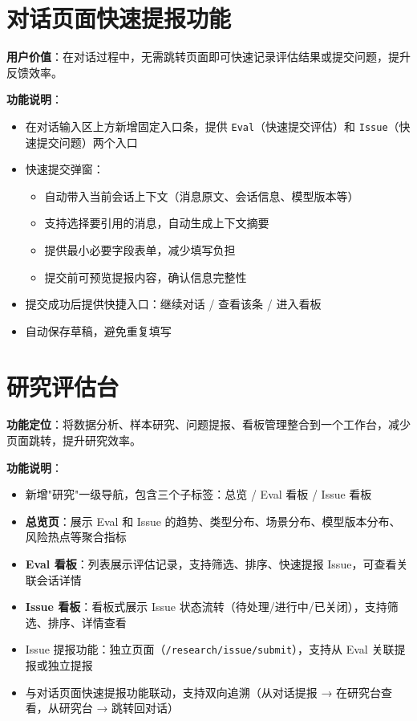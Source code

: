 \documentclass[UTF8]{ctexart}
\begin{document}
\section{对话页面快速提报功能}

\textbf{用户价值}：在对话过程中，无需跳转页面即可快速记录评估结果或提交问题，提升反馈效率。

\textbf{功能说明}：
\begin{itemize}
    \item 在对话输入区上方新增固定入口条，提供 \texttt{Eval}（快速提交评估）和 \texttt{Issue}（快速提交问题）两个入口
    \item 快速提交弹窗：
    \begin{itemize}
        \item 自动带入当前会话上下文（消息原文、会话信息、模型版本等）
        \item 支持选择要引用的消息，自动生成上下文摘要
        \item 提供最小必要字段表单，减少填写负担
        \item 提交前可预览提报内容，确认信息完整性
    \end{itemize}
    \item 提交成功后提供快捷入口：继续对话 / 查看该条 / 进入看板
    \item 自动保存草稿，避免重复填写
\end{itemize}

\section{研究评估台}

\textbf{功能定位}：将数据分析、样本研究、问题提报、看板管理整合到一个工作台，减少页面跳转，提升研究效率。

\textbf{功能说明}：
\begin{itemize}
    \item 新增"研究"一级导航，包含三个子标签：总览 / Eval 看板 / Issue 看板
    \item \textbf{总览页}：展示 Eval 和 Issue 的趋势、类型分布、场景分布、模型版本分布、风险热点等聚合指标
    \item \textbf{Eval 看板}：列表展示评估记录，支持筛选、排序、快速提报 Issue，可查看关联会话详情
    \item \textbf{Issue 看板}：看板式展示 Issue 状态流转（待处理/进行中/已关闭），支持筛选、排序、详情查看
    \item Issue 提报功能：独立页面（\texttt{/research/issue/submit}），支持从 Eval 关联提报或独立提报
    \item 与对话页面快速提报功能联动，支持双向追溯（从对话提报 → 在研究台查看，从研究台 → 跳转回对话）
\end{itemize}
\end{document}
